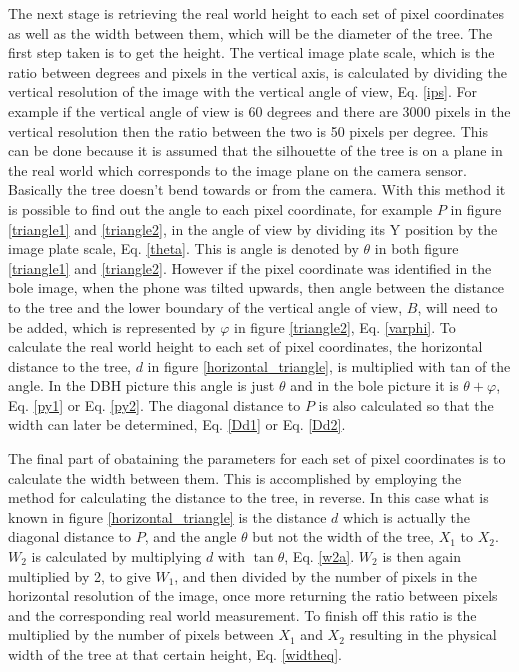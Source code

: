 The next stage is retrieving the real world height to each set of pixel coordinates as well as the width between them, which will be the diameter of the tree. The first step taken is to get the height. The vertical image plate scale, which is the ratio between degrees and pixels in the vertical axis, is calculated by dividing the vertical resolution of the image with the vertical angle of view, Eq. \ref{ips}. For example if the vertical angle of view is 60 degrees and there are 3000 pixels in the vertical resolution then the ratio between the two is 50 pixels per degree. This can be done because it is assumed that the silhouette of the tree is on a plane in the real world which corresponds to the image plane on the camera sensor. Basically the tree doesn't bend towards or from the camera. With this method it is possible to find out the angle to each pixel coordinate, for example $P$ in figure \ref{triangle1} and \ref{triangle2}, in the angle of view by dividing its Y position by the image plate scale, Eq. \ref{theta}. This is angle is denoted by $\theta$ in both figure \ref{triangle1} and \ref{triangle2}. However if the pixel coordinate was identified in the bole image, when the phone was tilted upwards, then angle between the distance to the tree and the lower boundary of the vertical angle of view, $B$, will need to be added, which is represented by $\varphi$ in figure \ref{triangle2}, Eq. \ref{varphi}. To calculate the real world height to each set of pixel coordinates, the horizontal distance to the tree, $d$ in figure \ref{horizontal_triangle}, is multiplied with tan of the angle. In the DBH picture this angle is just $\theta$ and in the bole picture it is $\theta + \varphi$, Eq. \ref{py1} or Eq. \ref{py2}. The diagonal distance to $P$ is also calculated so that the width can later be determined, Eq. \ref{Dd1} or Eq. \ref{Dd2}.

The final part of obataining the parameters for each set of pixel coordinates is to calculate the width between them. This is accomplished by employing the method for calculating the distance to the tree, in reverse. In this case what is known in figure \ref{horizontal_triangle} is the distance $d$ which is actually the diagonal distance to $P$, and the angle $\theta$ but not the width of the tree, $X_1$ to $X_2$. $W_2$ is calculated by multiplying $d$ with $\tan{\theta}$, Eq. \ref{w2a}. $W_2$ is then again multiplied by 2, to give $W_1$, and then divided by the number of pixels in the horizontal resolution of the image, once more returning the ratio between pixels and the corresponding real world measurement. To finish off this ratio is the multiplied by the number of pixels between $X_1$ and $X_2$ resulting in the physical width of the tree at that certain height, Eq. \ref{widtheq}.


